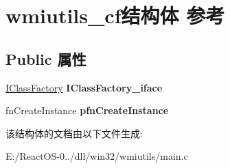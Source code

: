 \hypertarget{structwmiutils__cf}{}\section{wmiutils\+\_\+cf结构体 参考}
\label{structwmiutils__cf}
\subsection*{Public 属性}
\begin{DoxyCompactItemize}
\item 
\mbox{\label{structwmiutils__cf_a644cbc33c26c645b462ca7932e0592c5}} 
\hyperlink{interface_i_class_factory}{I\+Class\+Factory} {\bfseries I\+Class\+Factory\+\_\+iface}
\item 
\mbox{\label{structwmiutils__cf_abc9ac26d99524cf88117797ec4a1f476}} 
fn\+Create\+Instance {\bfseries pfn\+Create\+Instance}
\end{DoxyCompactItemize}


该结构体的文档由以下文件生成\+:\begin{DoxyCompactItemize}
\item 
E\+:/\+React\+O\+S-\/0../dll/win32/wmiutils/main.\+c\end{DoxyCompactItemize}
